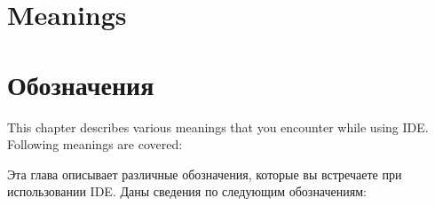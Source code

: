 \ifenglish
\chapter{Meanings}
\else
\chapter{Обозначения}
\fi
{}

\ifenglish
This chapter describes various meanings that you encounter while using IDE.
Following meanings are covered:

\else
Эта глава описывает различные обозначения, которые вы встречаете при 
использовании IDE. 
Даны сведения по следующим обозначениям:
\fi







